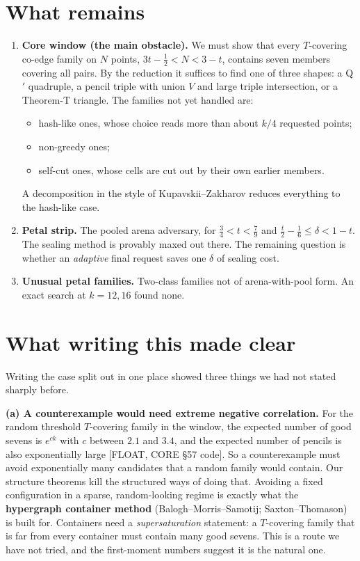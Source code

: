 \documentclass[11pt]{article}
\newcommand{\st}[1]{\textsf{\small[#1]}}
\begin{document}
\section{What remains}
\begin{enumerate}
\item \textbf{Core window (the main obstacle).} We must show that every $T$-covering co-edge family on $N$ points,
$3t-\tfrac12<N<3-t$, contains seven members covering all pairs. By the reduction it suffices to find one of three
shapes: a Q$'$ quadruple, a pencil triple with union $V$ and large triple intersection, or a Theorem-T triangle. The
families not yet handled are:
 \begin{itemize}
 \item hash-like ones, whose choice reads more than about $k/4$ requested points;
 \item non-greedy ones;
 \item self-cut ones, whose cells are cut out by their own earlier members.
 \end{itemize}
 A decomposition in the style of Kupavskii--Zakharov reduces everything to the hash-like case.
\item \textbf{Petal strip.} The pooled arena adversary, for $\tfrac34<t<\tfrac79$ and
$\tfrac t2-\tfrac16\le\delta<1-t$. The sealing method is provably maxed out there. The remaining question is whether
an \emph{adaptive} final request saves one $\delta$ of sealing cost.
\item \textbf{Unusual petal families.} Two-class families not of arena-with-pool form. An exact search at $k=12,16$
found none.
\end{enumerate}

\section{What writing this made clear}
Writing the case split out in one place showed three things we had not stated sharply before.

\textbf{(a) A counterexample would need extreme negative correlation.} For the random threshold $T$-covering family
in the window, the expected number of good sevens is $e^{ck}$ with $c$ between $2.1$ and $3.4$, and the expected
number of pencils is also exponentially large \st{FLOAT, CORE \S57 code}. So a counterexample must avoid exponentially
many candidates that a random family would contain. Our structure theorems kill the structured ways of doing that.
Avoiding a fixed configuration in a sparse, random-looking regime is exactly what the \textbf{hypergraph container
method} (Balogh--Morris--Samotij; Saxton--Thomason) is built for. Containers need a \emph{supersaturation} statement:
a $T$-covering family that is far from every container must contain many good sevens. This is a route we have not
tried, and the first-moment numbers suggest it is the natural one.
\end{document}
